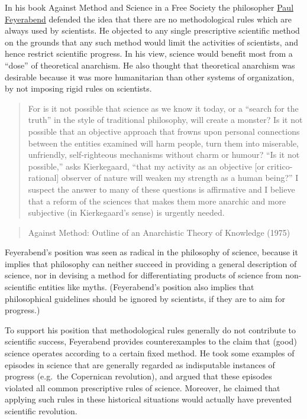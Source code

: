 In his book Against Method and Science in a Free Society the philosopher \href{https://en.wikipedia.org/wiki/Paul_Feyerabend}{Paul Feyerabend} defended the idea that there are no methodological rules which are always used by scientists. He objected to any single prescriptive scientific method on the grounds that any such method would limit the activities of scientists, and hence restrict scientific progress. In his view, science would benefit most from a ``dose'' of theoretical anarchism. He also thought that theoretical anarchism was desirable because it was more humanitarian than other systems of organization, by not imposing rigid rules on scientists.

\begin{quote}
For is it not possible that science as we know it today, or a ``search for the truth'' in the style of traditional philosophy, will create a monster? Is it not possible that an objective approach that frowns upon personal connections between the entities examined will harm people, turn them into miserable, unfriendly, self-righteous mechanisms without charm or humour? ``Is it not possible,'' asks Kierkegaard, ``that my activity as an objective {[}or critico-rational{]} observer of nature will weaken my strength as a human being?'' I suspect the answer to many of these questions is affirmative and I believe that a reform of the sciences that makes them more anarchic and more subjective (in Kierkegaard's sense) is urgently needed.
\end{quote}

\begin{quote}
Against Method: Outline of an Anarchistic Theory of Knowledge (1975)
\end{quote}

Feyerabend's position was seen as radical in the philosophy of science, because it implies that philosophy can neither succeed in providing a general description of science, nor in devising a method for differentiating products of science from non-scientific entities like myths. (Feyerabend's position also implies that philosophical guidelines should be ignored by scientists, if they are to aim for progress.)

To support his position that methodological rules generally do not contribute to scientific success, Feyerabend provides counterexamples to the claim that (good) science operates according to a certain fixed method. He took some examples of episodes in science that are generally regarded as indisputable instances of progress (e.g.~the Copernican revolution), and argued that these episodes violated all common prescriptive rules of science. Moreover, he claimed that applying such rules in these historical situations would actually have prevented scientific revolution.

